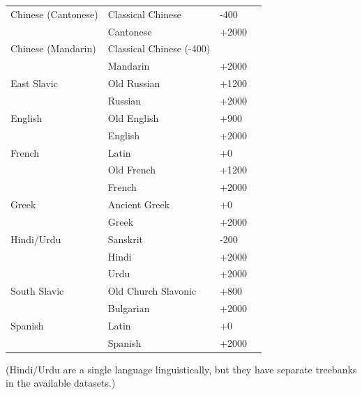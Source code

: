 \documentclass[11pt,a4paper]{article}
\begin{document}
\begin{tabular}{llll} \hline
Chinese (Cantonese) & Classical Chinese & -400  \\
& Cantonese & +2000\\ \hline
Chinese (Mandarin) & Classical Chinese (-400)  \\
& Mandarin & +2000 \\ \hline
East Slavic & Old Russian & +1200 \\
& Russian & +2000 \\ \hline
English & Old English & +900 \\
& English  & +2000\\ \hline
French & Latin &+0  \\
& Old French &+1200\\
& French  & +2000\\ \hline
Greek & Ancient Greek & +0 \\
& Greek  & +2000\\ \hline
Hindi/Urdu & Sanskrit & -200 \\
& Hindi  & +2000\\
& Urdu  & +2000\\ \hline
South Slavic & Old Church Slavonic & +800 \\
& Bulgarian  & +2000\\ \hline
Spanish & Latin &+0 \\
& Spanish  & +2000\\ \hline
\end{tabular}

(Hindi/Urdu are a single language linguistically, but they have separate treebanks in the available datasets.)


\end{document}
